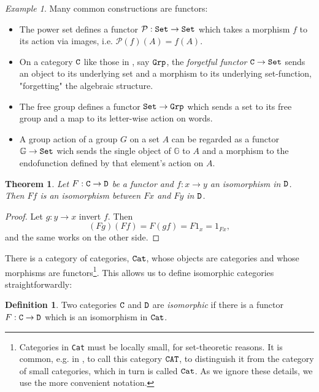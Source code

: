 \documentclass[11 pt]{amsart}
\theoremstyle{plain}   %
\newtheorem{thm}{Theorem}[section] %
\theoremstyle{definition}
\newtheorem{defn}{Definition}[section]
\theoremstyle{remark}
\newtheorem{ex}{Example}[section]
\numberwithin{equation}{section}
\def\cP{\mathcal{P}}
\def\GG{\mathbb{G}}
\newcommand{\cat}[1]{{\normalfont\texttt{#1}}}
\begin{document}
\begin{ex}
	Many common constructions are functors:
	\begin{itemize}
		\item The power set defines a functor $\cP:
			      \cat{Set}\rightarrow\cat{Set}$ which takes a morphism $f$ to its
		      action via images, i.e. $\cP(f)(A) = f(A)$.
		\item On a category $\cat{C}$ like those in ,
		      say $\cat{Grp}$, the \emph{forgetful functor}
		      $\cat{C}\rightarrow\cat{Set}$ sends an object to its underlying set
		      and a morphism to its underlying set-function,
		      "forgetting" the algebraic structure.
		\item The free group defines a functor $\cat{Set}\rightarrow\cat{Grp}$ which
		      sends a set to its free group and a map to its letter-wise action on
		      words.
		\item A group action of a group $G$ on a set $A$ can be regarded as a functor
		      $\GG\rightarrow\cat{Set}$ wich sends the single object of $\GG$ to $A$ and
		      a morphism to the endofunction defined by that element's action on
		      $A$.
	\end{itemize}
\end{ex}

\begin{thm}\label{functors preserve isomorphism}
	Let $F: \cat{C}\rightarrow \cat{D}$ be a functor and $f: x\rightarrow y$ an isomorphism in
	$\cat{D}$. Then $Ff$ is an isomorphism between $Fx$ and $Fy$ in $\cat{D}$.
\end{thm}

\begin{proof}
	Let $g: y\rightarrow x$ invert $f$. Then $$(Fg)(Ff) = F(gf) = F1_x = 1_{Fx},$$
	and the same works on the other side.
\end{proof}

There is a category of categories, $\cat{Cat}$, whose objects are categories and
whose morphisms are functors\footnote{Categories in \cat{Cat} must be locally
	small, for set-theoretic reasons. It is common, e.g. in \cite{Riehl}, to call
	this category $\cat{CAT}$, to distinguish it from the category of small
	categories, which in turn is called $\cat{Cat}$. As we ignore these details, we
	use the more convenient notation.}. This allows us to define isomorphic
categories straightforwardly:

\begin{defn}
	Two categories $\cat{C}$ and $\cat{D}$ are \emph{isomorphic} if there is a
	functor $F: \cat{C}\rightarrow\cat{D}$ which is an isomorphism in $\cat{Cat}$.
\end{defn}
\end{document}
